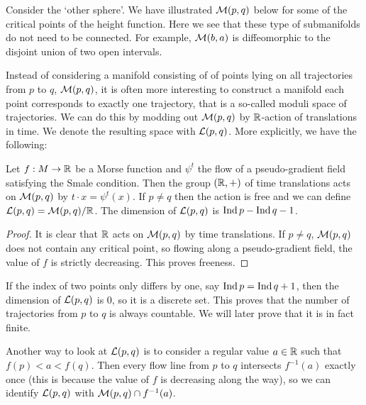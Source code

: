 \begin{eg}
    Consider the `other sphere'. 
    We have illustrated $\mathcal M(p, q)$ below for some of the critical points of the height function.
    Here we see that these type of submanifolds do not need to be connected. For example, $\mathcal M(b, a)$ is diffeomorphic to the disjoint union of two open intervals.
\end{eg}
\begin{figure}[H]
    \centering
\end{figure}

Instead of considering a manifold consisting of of points lying on all trajectories from $p$ to $q$, $\mathcal M(p, q)$, it is often more interesting to construct a manifold each point corresponds to exactly one trajectory, that is a so-called moduli space of trajectories.
We can do this by modding out $\mathcal M(p, q)$ by $\mathbb{R}$-action of translations in time. We denote the resulting space with $\mathcal L(p, q)$.
More explicitly, we have the following:

\begin{prop}
    Let $f: M \to  \mathbb{R}$ be a Morse function and $\psi^{t}$ the flow of a pseudo-gradient field satisfying the Smale condition.
    Then the group $(\mathbb{R}, +)$ of time translations acts on $\mathcal M(p, q)$ by  $t \cdot x = \psi^{t}(x)$.  If $p \neq q$ then the action is free and we can define $ \mathcal L(p, q) = \mathcal M(p, q) / \mathbb{R} $. The dimension of $\mathcal L(p, q)$ is $\operatorname{Ind} p - \operatorname{Ind} q - 1$.
\end{prop}
\begin{proof}
    It is clear that $\mathbb{R}$ acts on $\mathcal M(p, q)$ by time translations. 
    If $p \neq q$,  $\mathcal M(p, q)$ does not contain any critical point, so flowing along a pseudo-gradient field, the value of $f$ is strictly decreasing. This proves freeness.
\end{proof}

\begin{remark}
    If the index of two points only differs by one, say $\operatorname{Ind} p = \operatorname{Ind} q + 1$, then the dimension of $\mathcal L(p, q)$ is $0$, so it is a discrete set.
    This proves that the number of trajectories from $p$ to $q$ is always countable.
    We will later prove that it is in fact finite.
    \label{remark:trajectories-finite}
\end{remark}
\begin{remark}
    Another way to look at $\mathcal L(p, q)$ is to consider a regular value $a \in \mathbb{R}$ such that $f(p)<a<f(q)$. Then every flow line from $p$ to $q$  intersects $f^{-1}(a)$ exactly once (this is because the value of $f$ is decreasing along the way), so we can identify  $\mathcal L(p, q)$ with  $\mathcal M(p, q) \cap f^{-1}(a)$.
\end{remark}


